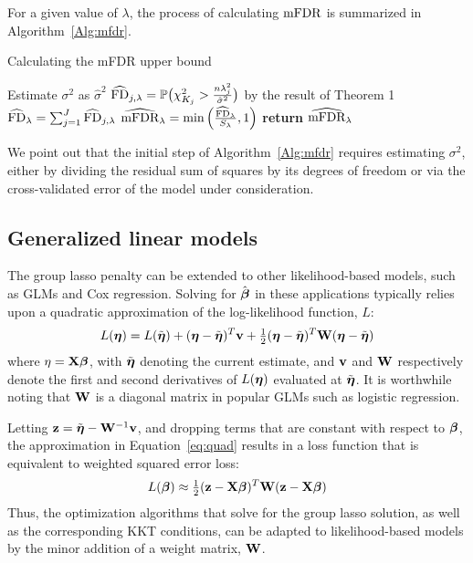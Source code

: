 For a given value of $\lambda$, the process of calculating $\textrm{mFDR}$ is summarized in Algorithm~\ref{Alg:mfdr}.

\begin{algorithm*}
\caption{Calculating the mFDR upper bound}\label{Alg:mfdr}
\begin{algorithmic}[10]
\Procedure{}{}
\State Estimate $\sigma^2$ as $\hat{\sigma}^2$
\State $\widehat{\textrm{FD}}_{j, \lambda} = \mathbb{P} \big(\chi^2_{K_j} > \frac{n\lambda_j^2}{\hat{\sigma}^2}\big)$ by the result of Theorem 1
\EndFor
\State $\widehat{\textrm{FD}}_\lambda = \sum_{j=1}^{J} \widehat{\textrm{FD}}_{j, \lambda} $
\State $\widehat{\textrm{mFDR}}_\lambda = \text{min}\left(\frac{\widehat{\textrm{FD}}_\lambda}{S_\lambda}, 1 \right)$
\EndProcedure
\State \textbf{return} $\widehat{\textrm{mFDR}}_\lambda $
\end{algorithmic}
\end{algorithm*}

We point out that the initial step of Algorithm~\ref{Alg:mfdr} requires estimating $\sigma^2$, either by dividing the residual sum of squares by its degrees of freedom or via the cross-validated error of the model under consideration. 

\subsection{Generalized linear models}
\label{Sec:glm}

The group lasso penalty can be extended to other likelihood-based models, such as GLMs and Cox regression. Solving for $\hat{\boldsymbol{\beta}}$ in these applications typically relies upon a quadratic approximation of the log-likelihood function, $L$:
\begin{equation}
\label{eq:quad}
L(\boldsymbol{\eta}) = L(\tilde{\boldsymbol{\eta}}) + (\boldsymbol{\eta} - \tilde{\boldsymbol{\eta}})^T\mathbf{v} + \tfrac{1}{2}(\boldsymbol{\eta} - \tilde{\boldsymbol{\eta}})^T\mathbf{W}(\boldsymbol{\eta} - \tilde{\boldsymbol{\eta}})
\end{equation}
where $\eta = \mathbf{X}\boldsymbol{\beta}$, with $\tilde{\boldsymbol{\eta}}$ denoting the current estimate, and $\mathbf{v}$ and $\mathbf{W}$ respectively denote the first and second derivatives of $L(\boldsymbol{\eta})$ evaluated at $\tilde{\boldsymbol{\eta}}$. It is worthwhile noting that $\mathbf{W}$ is a diagonal matrix in popular GLMs such as logistic regression.

Letting $\mathbf{z} = \tilde{\boldsymbol{\eta}} - \mathbf{W}^{-1}\mathbf{v}$, and dropping terms that are constant with respect to $\boldsymbol{\beta}$, the approximation in Equation~\ref{eq:quad} results in a loss function that is equivalent to weighted squared error loss:
\begin{equation}
L(\boldsymbol{\beta}) \approx \tfrac{1}{2}(\mathbf{z} - \mathbf{X}\boldsymbol{\beta})^T\mathbf{W}(\mathbf{z} - \mathbf{X}\boldsymbol{\beta})
\end{equation}
Thus, the optimization algorithms that solve for the group lasso solution, as well as the corresponding KKT conditions, can be adapted to likelihood-based models by the minor addition of a weight matrix, $\mathbf{W}$. 

